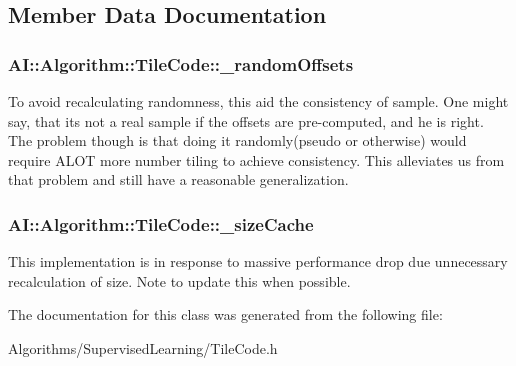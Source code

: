 \subsection{Member Data Documentation}
\hypertarget{classAI_1_1Algorithm_1_1TileCode_afbe28b5932dec68724048dbccfd9a338}{
\subsubsection[{\+\_\+random\+Offsets}]{\setlength{\rightskip}{0pt plus 5cm}A\+I\+::\+Algorithm\+::\+Tile\+Code\+::\+\_\+random\+Offsets\hspace{0.3cm}{\ttfamily [protected]}}}\label{classAI_1_1Algorithm_1_1TileCode_afbe28b5932dec68724048dbccfd9a338}
To avoid recalculating randomness, this aid the consistency of sample. One might say, that its not a real sample if the offsets are pre-\/computed, and he is right. The problem though is that doing it randomly(pseudo or otherwise) would require A\+L\+O\+T more number tiling to achieve consistency. This alleviates us from that problem and still have a reasonable generalization. \hypertarget{classAI_1_1Algorithm_1_1TileCode_a233a9e2d90544b8070788bb65b6bde52}{
\subsubsection[{\+\_\+size\+Cache}]{\setlength{\rightskip}{0pt plus 5cm}A\+I\+::\+Algorithm\+::\+Tile\+Code\+::\+\_\+size\+Cache\hspace{0.3cm}{\ttfamily [protected]}}}\label{classAI_1_1Algorithm_1_1TileCode_a233a9e2d90544b8070788bb65b6bde52}
This implementation is in response to massive performance drop due unnecessary recalculation of size. Note to update this when possible. 

The documentation for this class was generated from the following file\+:\begin{DoxyCompactItemize}
\item 
Algorithms/\+Supervised\+Learning/Tile\+Code.\+h\end{DoxyCompactItemize}
